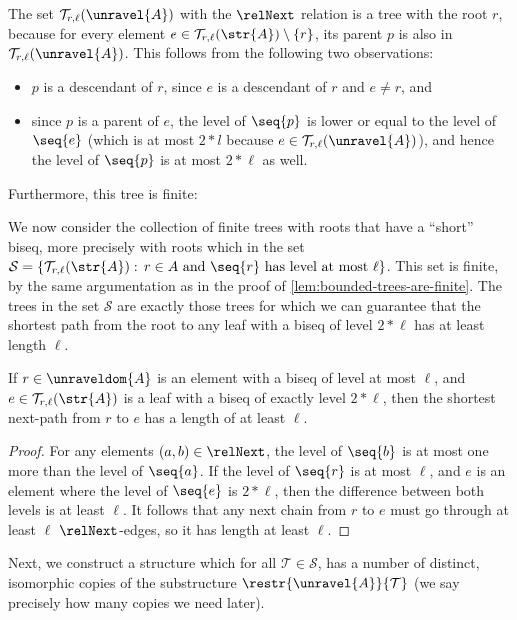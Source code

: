 \noindent
The set $\mathcal{T}_{r,\ell}(\unravel{A})$ with the $\relNext$ relation is a tree with the root $r$, because for every element $e \in \mathcal{T}_{r,\ell}(\str{A}) \setminus \{r\}$, its parent $p$ is also in $\mathcal{T}_{r,\ell}(\unravel{A})$.
This follows from the following two observations:
\begin{itemize}
  \item $p$ is a descendant of $r$, since $e$ is a descendant of $r$ and $e \neq r$, and
  \item since $p$ is a parent of $e$, the level of $\seq{p}$ is lower or equal to the level of $\seq{e}$ (which is at most $2 * l$ because $e \in \mathcal{T}_{r,\ell}(\unravel{A})$), and hence the level of $\seq{p}$ is at most $2 * \ell$ as well.
\end{itemize}
Furthermore, this tree is finite:

\noindent
We now consider the collection of finite trees with roots that have a ``short'' biseq, more precisely with roots which in the set $\mathcal{S} = \left\{ \mathcal{T}_{r,\ell}(\str{A}):\, r \in A \text{ and } \seq{r}\ \text{has level at most $\ell$}\right\}$.
This set is finite, by the same argumentation as in the proof of \cref{lem:bounded-trees-are-finite}.
The trees in the set $\mathcal{S}$ are exactly those trees for which we can guarantee that the shortest path from the root to any leaf with a biseq of level $2 * \ell$ has at least length $\ell$.
\begin{lemma}\label{lem:bounded-trees-shortest-next-path}
  If $r \in \unraveldom{A}$ is an element with a biseq of level at most $\ell$, and $e \in \mathcal{T}_{r,\ell}(\str{A})$ is a leaf with a biseq of exactly level $2 * \ell$, then the shortest next-path from $r$ to $e$ has a length of at least $\ell$.
\end{lemma}
\begin{proof}
  For any elements $(a,b) \in \relNext$, the level of $\seq{b}$ is at most one more than the level of $\seq{a}$.
  If the level of $\seq{r}$ is at most $\ell$, and $e$ is an element where the level of $\seq{e}$ is $2 * \ell$, then the difference between both levels is at least $\ell$.
  It follows that any next chain from $r$ to $e$ must go through at least $\ell$ $\relNext$-edges, so it has length at least $\ell$.
\end{proof}
Next, we construct a structure which for all $\mathcal{T} \in \mathcal{S}$, has a number of distinct, isomorphic copies of the substructure $\restr{\unravel{A}}{\mathcal{T}}$ (we say precisely how many copies we need later).
